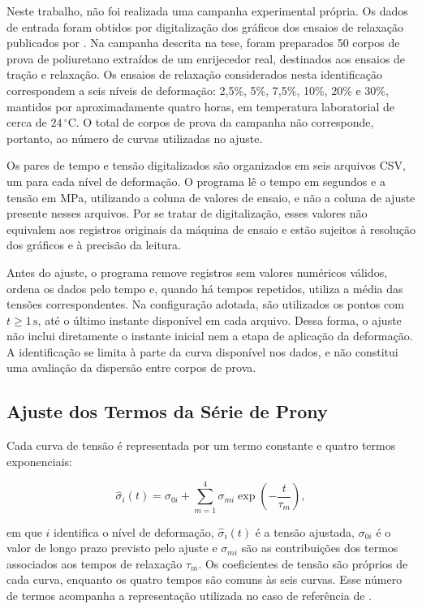 \documentclass[arial,centeredequations,english,brazilian,oneside,section=TITLE]{ifes8}
\begin{document}
Neste trabalho, não foi realizada uma campanha experimental própria. Os dados de entrada foram
obtidos por digitalização dos gráficos dos ensaios de relaxação publicados por
. Na campanha descrita na tese, foram preparados 50 corpos de
prova de poliuretano extraídos de um enrijecedor real, destinados aos ensaios de tração e
relaxação. Os ensaios de relaxação considerados nesta identificação correspondem a seis níveis
de deformação: 2,5\%, 5\%, 7,5\%, 10\%, 20\% e 30\%, mantidos por aproximadamente quatro horas,
em temperatura laboratorial de cerca de $24\,^{\circ}\mathrm{C}$. O total de corpos de prova
da campanha não corresponde, portanto, ao número de curvas utilizadas no ajuste.

Os pares de tempo e tensão digitalizados são organizados em seis arquivos CSV, um para cada
nível de deformação. O programa lê o tempo em segundos e a tensão em MPa, utilizando a coluna
de valores de ensaio, e não a coluna de ajuste presente nesses arquivos. Por se tratar de
digitalização, esses valores não equivalem aos registros
originais da máquina de ensaio e estão sujeitos à resolução dos gráficos e à precisão da
leitura.

Antes do ajuste, o programa remove registros sem valores numéricos válidos, ordena os dados
pelo tempo e, quando há tempos repetidos, utiliza a média das tensões correspondentes.
Na configuração adotada, são utilizados os pontos com $t\geq1\,\mathrm{s}$, até o último
instante disponível em cada arquivo. Dessa forma, o ajuste não inclui diretamente o instante
inicial nem a etapa de aplicação da deformação. A identificação se limita à parte da curva
disponível nos dados, e não constitui uma avaliação da dispersão entre corpos de prova.

\subsection{Ajuste dos Termos da Série de Prony}
\label{sec:ajuste-prony}

Cada curva de tensão é representada por um termo constante e quatro termos exponenciais:

\begin{equation}
  \label{eq:ajuste-tensao-prony}
  \widehat{\sigma}_i(t)=\sigma_{0i}
  +\sum_{m=1}^{4}\sigma_{mi}\exp\left(-\frac{t}{\tau_m}\right),
\end{equation}

em que $i$ identifica o nível de deformação, $\widehat{\sigma}_i(t)$ é a tensão ajustada,
$\sigma_{0i}$ é o valor de longo prazo previsto pelo ajuste e $\sigma_{mi}$ são as
contribuições dos termos associados aos tempos de relaxação $\tau_m$. Os coeficientes de
tensão são próprios de cada curva, enquanto os quatro tempos são comuns às seis curvas.
Esse número de termos acompanha a representação utilizada no caso de referência de
.
\end{document}
